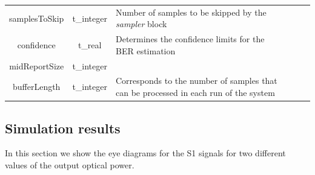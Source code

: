 \begin{table}[H]
\begin{tabular}{|c|c|p{70mm}|ccp{70mm}}
		samplesToSkip & t\_integer & Number of samples to be skipped by the \textit{sampler} block &    \\ \cline{1-3}
		confidence & t\_real & Determines the confidence limits for the BER estimation &    \\ \cline{1-3}
		midReportSize & t\_integer &  &    \\ \cline{1-3}
		bufferLength & t\_integer & Corresponds to the number of samples that can be processed in each run of the system &    \\ \cline{1-3}
		\end{tabular}
		\label{table:in_par}
		\end{table}

\subsection*{Simulation results}

In this section we show the eye diagrams for the S1 signals for two different values of the output optical power.

